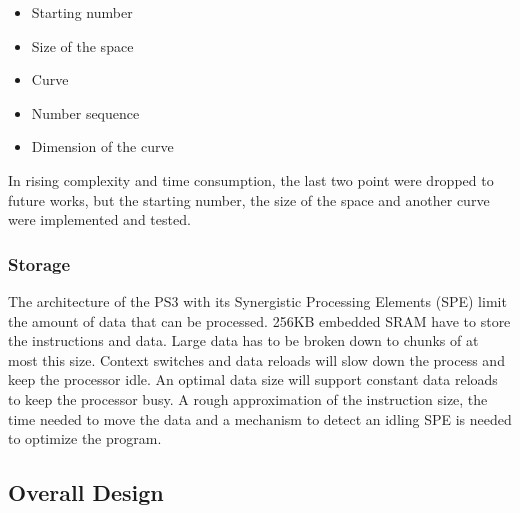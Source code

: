 \begin{itemize}%
   \item Starting number
   \item Size of the space
   \item Curve
   \item Number sequence
   \item Dimension of the curve   
\end{itemize}%

In rising complexity and time consumption, the last two point were dropped to future works, but the starting number, the size of the space and another curve were implemented and tested.

\subsubsection{Storage}
\label{sec:concurrency}
The architecture of the PS3 with its Synergistic Processing Elements (SPE) limit the amount of data that can be processed. 256KB embedded SRAM have to store the instructions and data.\cite{PTC}
Large data has to be broken down to chunks of at most this size. Context switches and data reloads will slow down the process and keep the processor idle. An optimal data size will support constant data reloads to keep the processor busy. A rough approximation of the instruction size, the time needed to move the data and a mechanism to detect an idling SPE is needed to optimize the program.

\subsection{Overall Design}
\label{sec:overall_design}





